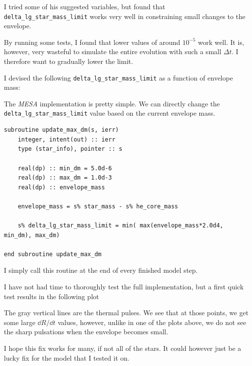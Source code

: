 \documentclass[a4paper,10pt]{article}
\begin{document}
I tried some of his suggested variables, but found that \lstinline[style=output, breaklines=true]|delta_lg_star_mass_limit| works very well in constraining small changes to the envelope.

By running some tests, I found that lower values of around \(10^{-5}\) work well. It is, however, very wasteful to simulate the entire evolution with such a small \(\Delta t\). I therefore want to gradually lower the limit. 

I devised the following \lstinline[style=output, breaklines=true]|delta_lg_star_mass_limit| as a function of envelope mass:

\begin{figure}[ht]
    \centering
\end{figure}

The \emph{MESA} implementation is pretty simple. We can directly change the \lstinline[style=output, breaklines=true]|delta_lg_star_mass_limit| value based on the current envelope mass.

\begin{verbatim}
subroutine update_max_dm(s, ierr)
    integer, intent(out) :: ierr
    type (star_info), pointer :: s

    real(dp) :: min_dm = 5.0d-6
    real(dp) :: max_dm = 1.0d-3
    real(dp) :: envelope_mass

    envelope_mass = s% star_mass - s% he_core_mass

    s% delta_lg_star_mass_limit = min( max(envelope_mass*2.0d4, min_dm), max_dm)

end subroutine update_max_dm
\end{verbatim}
I simply call this routine at the end of every finished model step.

I have not had time to thoroughly test the full implementation, but a first quick test results in the following plot
\begin{figure}[ht]
    \centering
\end{figure}

The gray vertical lines are the thermal pulses. We see that at those points, we get some large \(\dd{R} / \dd{t} \) values, however, unlike in one of the plots above, we do not see the sharp pulsations when the envelope becomes small.

I hope this fix works for many, if not all of the stars. It could however just be a lucky fix for the model that I tested it on.
\end{document}
